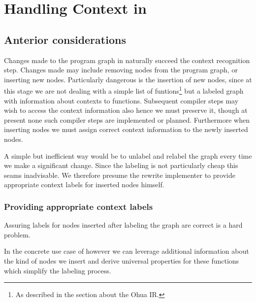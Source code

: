 \chapter{Handling Context in \yauhau}

\label{ChapterRewrites}

\section{Anterior considerations} %

Changes made to the program graph in \yauhau{} naturally succeed the context recognition step.
Changes made may include removing nodes from the program graph, or inserting new nodes.
Particularly dangerous is the insertion of new nodes, since at this stage we are not dealing with a simple list of funtions\footnote{As described in the section about the Ohua IR.} but a labeled graph with information about contexts to functions.
Subsequent compiler steps may wish to access the context information also hence we must preserve it, though at present none such compiler steps are implemented or planned.
Furthermore when inserting nodes we must assign correct context information to the newly inserted nodes.

A simple but inefficient way would be to unlabel and relabel the graph every time we make a significant change.
Since the labeling is not particularly cheap this seams inadvisable.
We therefore presume the rewrite implementer to provide appropriate context labels for inserted nodes himself.

\subsection{Providing appropriate context labels}

Assuring labels for nodes inserted after labeling the graph are correct is a hard problem. %

In the concrete use case of \yauhau{} however we can leverage additional information about the kind of nodes we insert and derive universal properties for these functions which simplify the labeling process.
